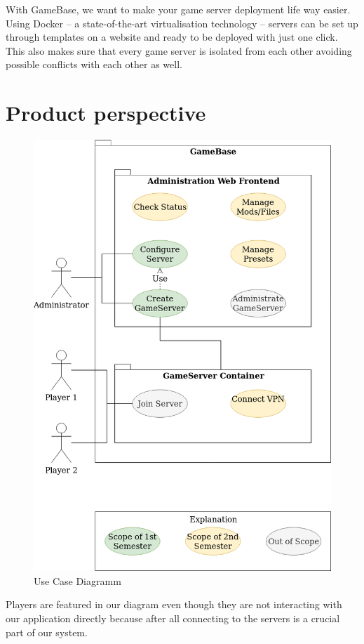 \documentclass[a4paper,12pt,chapterprefix=false,bibliography=totoc,listof=totoc,]{scrreprt}
\begin{document}
With GameBase, we want to make your game server deployment life way easier. Using Docker – a state-of-the-art virtualisation technology – servers can be set up through templates on a website and ready to be deployed with just one click. This also makes sure that every game server is isolated from each other avoiding possible conflicts with each other as well.

\section{Product perspective}
\begin{figure}
	\includegraphics[width=\textwidth]{Use_Case_Diagramm.png}
	\caption{Use Case Diagramm}
	\label{fig:ucd}
\end{figure}
Players are featured in our diagram even though they are not interacting with our application directly because after all connecting to the servers is a crucial part of our system.
\end{document}
